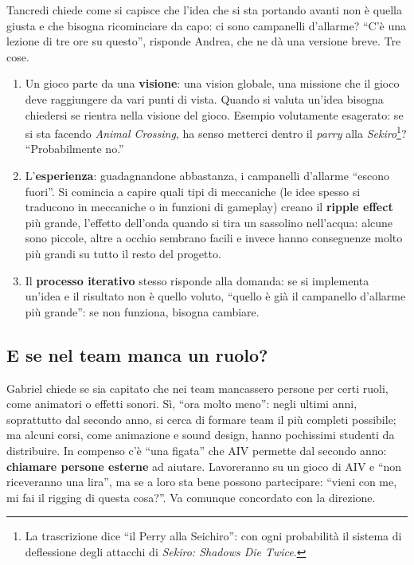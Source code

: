 Tancredi chiede come si capisce che l'idea che si sta portando avanti non è
quella giusta e che bisogna ricominciare da capo: ci sono campanelli
d'allarme? ``C'è una lezione di tre ore su questo'', risponde Andrea, che ne
dà una versione breve. Tre cose.
\begin{enumerate}
  \item Un gioco parte da una \textbf{visione}: una vision globale, una
        missione che il gioco deve raggiungere da vari punti di vista.
        Quando si valuta un'idea bisogna chiedersi se rientra nella visione
        del gioco. Esempio volutamente esagerato: se si sta facendo
        \emph{Animal Crossing}, ha senso metterci dentro il \emph{parry} alla
        \emph{Sekiro}\footnote{La trascrizione dice ``il Perry alla
        Seichiro'': con ogni probabilità il sistema di deflessione degli
        attacchi di \emph{Sekiro: Shadows Die Twice}.}? ``Probabilmente no.''
  \item L'\textbf{esperienza}: guadagnandone abbastanza, i campanelli
        d'allarme ``escono fuori''. Si comincia a capire quali tipi di
        meccaniche (le idee spesso si traducono in meccaniche o in funzioni
        di gameplay) creano il \textbf{ripple effect} più grande, l'effetto
        dell'onda quando si tira un sassolino nell'acqua: alcune sono
        piccole, altre a occhio sembrano facili e invece hanno conseguenze
        molto più grandi su tutto il resto del progetto.
  \item Il \textbf{processo iterativo} stesso risponde alla domanda: se si
        implementa un'idea e il risultato non è quello voluto, ``quello è
        già il campanello d'allarme più grande'': se non funziona, bisogna
        cambiare.
\end{enumerate}

\subsection{E se nel team manca un ruolo?}

Gabriel chiede se sia capitato che nei team mancassero persone per certi
ruoli, come animatori o effetti sonori. Sì, ``ora molto meno'': negli ultimi
anni, soprattutto dal secondo anno, si cerca di formare team il più
completi possibile; ma alcuni corsi, come animazione e sound design, hanno
pochissimi studenti da distribuire. In compenso c'è ``una figata'' che AIV
permette dal secondo anno: \textbf{chiamare persone esterne} ad aiutare.
Lavoreranno su un gioco di AIV e ``non riceveranno una lira'', ma se a loro
sta bene possono partecipare: ``vieni con me, mi fai il rigging di questa
cosa?''. Va comunque concordato con la direzione.

